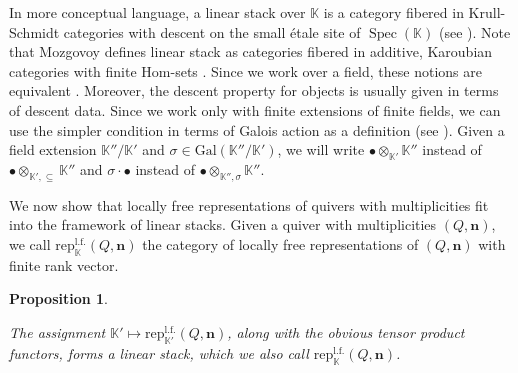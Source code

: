 \documentclass[11pt,english]{article}
\numberwithin{equation}{section}
\numberwithin{figure}{section}
\theoremstyle{definition}
\theoremstyle{plain}
\newtheorem{prop}[df]{Proposition}
\theoremstyle{remark}
\DeclareMathOperator{\Spec}{Spec}
\newcommand\nn{\mathbf{n}}
\newcommand\KK{\mathbb{K}}
\begin{document}
In more conceptual language, a linear stack over $\KK$ is a category
fibered in Krull-Schmidt categories with descent on the small étale
site of $\Spec(\KK)$ (see \cite[\S 4.1.3.]{Vis05}). Note that Mozgovoy
defines linear stack as categories fibered in additive, Karoubian
categories with finite Hom-sets \cite[\S 3.1.]{Moz19}. Since we work
over a field, these notions are equivalent \cite[\S 2.3.]{Moz19}.
Moreover, the descent property for objects is usually given in terms
of descent data. Since we work only with finite extensions of finite
fields, we can use the simpler condition in terms of Galois action
as a definition (see \cite[Lem. 3.5.]{Moz19}). Given a field extension
$\KK''/\KK'$ and $\sigma\in\mathrm{Gal}(\KK''/\KK')$, we will write
$\bullet\otimes_{\KK'}\KK''$ instead of $\bullet\otimes_{\KK',\subseteq}\KK''$
and $\sigma\cdot\bullet$ instead of $\bullet\otimes_{\KK'',\sigma}\KK''$.

We now show that locally free representations of quivers with multiplicities
fit into the framework of linear stacks. Given a quiver with multiplicities
$(Q,\nn)$, we call $\mathrm{rep}_{\KK}^{\mathrm{l.f.}}(Q,\nn)$ the
category of locally free representations of $(Q,\nn)$ with finite
rank vector.

\begin{prop} \label{Prop/LinearStack}

The assignment $\KK'\mapsto\mathrm{rep}_{\KK'}^{\mathrm{l.f.}}(Q,\nn)$,
along with the obvious tensor product functors, forms a linear stack,
which we also call $\mathrm{rep}_{\KK}^{\mathrm{l.f.}}(Q,\nn)$.

\end{prop}
\end{document}
